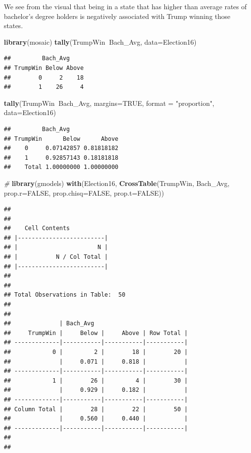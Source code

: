 \documentclass[]{article}
\newenvironment{Shaded}{\begin{snugshade}}{\end{snugshade}}
\newcommand{\CommentTok}[1]{\textcolor[rgb]{0.56,0.35,0.01}{\textit{#1}}}
\newcommand{\DataTypeTok}[1]{\textcolor[rgb]{0.13,0.29,0.53}{#1}}
\newcommand{\KeywordTok}[1]{\textcolor[rgb]{0.13,0.29,0.53}{\textbf{#1}}}
\newcommand{\NormalTok}[1]{#1}
\newcommand{\OperatorTok}[1]{\textcolor[rgb]{0.81,0.36,0.00}{\textbf{#1}}}
\newcommand{\OtherTok}[1]{\textcolor[rgb]{0.56,0.35,0.01}{#1}}
\newcommand{\StringTok}[1]{\textcolor[rgb]{0.31,0.60,0.02}{#1}}
\begin{document}
We see from the visual that being in a state that has higher than
average rates of bachelor's degree holders is negatively associated with
Trump winning those states.

\begin{Shaded}
\begin{Highlighting}[]
\KeywordTok{library}\NormalTok{(mosaic)}
\KeywordTok{tally}\NormalTok{(TrumpWin}\OperatorTok{~}\NormalTok{Bach_Avg, }\DataTypeTok{data=}\NormalTok{Election16)}
\end{Highlighting}
\end{Shaded}

\begin{verbatim}
##         Bach_Avg
## TrumpWin Below Above
##        0     2    18
##        1    26     4
\end{verbatim}

\begin{Shaded}
\begin{Highlighting}[]
\KeywordTok{tally}\NormalTok{(TrumpWin}\OperatorTok{~}\NormalTok{Bach_Avg, }\DataTypeTok{margins=}\OtherTok{TRUE}\NormalTok{, }\DataTypeTok{format =} \StringTok{"proportion"}\NormalTok{, }\DataTypeTok{data=}\NormalTok{Election16)}
\end{Highlighting}
\end{Shaded}

\begin{verbatim}
##         Bach_Avg
## TrumpWin      Below      Above
##    0     0.07142857 0.81818182
##    1     0.92857143 0.18181818
##    Total 1.00000000 1.00000000
\end{verbatim}

\begin{Shaded}
\begin{Highlighting}[]
\CommentTok{#}
\KeywordTok{library}\NormalTok{(gmodels)}
\KeywordTok{with}\NormalTok{(Election16, }\KeywordTok{CrossTable}\NormalTok{(TrumpWin, Bach_Avg,}
\DataTypeTok{prop.r=}\OtherTok{FALSE}\NormalTok{, }\DataTypeTok{prop.chisq=}\OtherTok{FALSE}\NormalTok{, }\DataTypeTok{prop.t=}\OtherTok{FALSE}\NormalTok{))}
\end{Highlighting}
\end{Shaded}

\begin{verbatim}
## 
##  
##    Cell Contents
## |-------------------------|
## |                       N |
## |           N / Col Total |
## |-------------------------|
## 
##  
## Total Observations in Table:  50 
## 
##  
##              | Bach_Avg 
##     TrumpWin |     Below |     Above | Row Total | 
## -------------|-----------|-----------|-----------|
##            0 |         2 |        18 |        20 | 
##              |     0.071 |     0.818 |           | 
## -------------|-----------|-----------|-----------|
##            1 |        26 |         4 |        30 | 
##              |     0.929 |     0.182 |           | 
## -------------|-----------|-----------|-----------|
## Column Total |        28 |        22 |        50 | 
##              |     0.560 |     0.440 |           | 
## -------------|-----------|-----------|-----------|
## 
## 
\end{verbatim}
\end{document}

